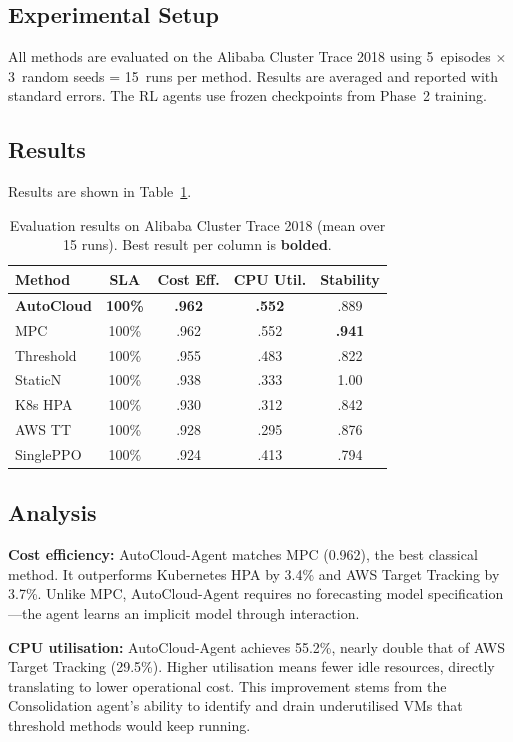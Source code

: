\documentclass[conference]{IEEEtran}
\begin{document}
\subsection{Experimental Setup}

All methods are evaluated on the Alibaba Cluster Trace 2018 using
5~episodes $\times$ 3~random seeds = 15~runs per method.  Results are
averaged and reported with standard errors.  The RL agents use frozen
checkpoints from Phase~2 training.

\subsection{Results}

Results are shown in Table~\ref{tab:results}.

\begin{table}[h]
\centering
\caption{Evaluation results on Alibaba Cluster Trace 2018 (mean over 15 runs).
Best result per column is \textbf{bolded}.}
\label{tab:results}
\begin{tabular}{lcccc}
\toprule
\textbf{Method} & \textbf{SLA} & \textbf{Cost Eff.} & \textbf{CPU Util.} & \textbf{Stability} \\
\midrule
\textbf{AutoCloud} & \textbf{100\%} & \textbf{.962} & \textbf{.552} & .889 \\
MPC & 100\% & .962 & .552 & \textbf{.941} \\
Threshold & 100\% & .955 & .483 & .822 \\
StaticN & 100\% & .938 & .333 & 1.00 \\
K8s HPA & 100\% & .930 & .312 & .842 \\
AWS TT & 100\% & .928 & .295 & .876 \\
SinglePPO & 100\% & .924 & .413 & .794 \\
\bottomrule
\end{tabular}
\end{table}

\subsection{Analysis}

\textbf{Cost efficiency:} AutoCloud-Agent matches MPC (0.962), the best
classical method.  It outperforms Kubernetes HPA by 3.4\% and AWS Target
Tracking by 3.7\%.  Unlike MPC, AutoCloud-Agent requires no forecasting model
specification---the agent learns an implicit model through interaction.

\textbf{CPU utilisation:} AutoCloud-Agent achieves 55.2\%, nearly
double that of AWS Target Tracking (29.5\%).  Higher utilisation means
fewer idle resources, directly translating to lower operational cost.
This improvement stems from the Consolidation agent's ability to identify and
drain underutilised VMs that threshold methods would keep running.
\end{document}
